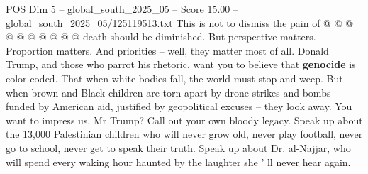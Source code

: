 \begin{textsample}{POS Dim 5 – global\_south\_2025\_05 – Score 15.00 – global\_south\_2025\_05/125119513.txt}
This is not to dismiss the pain of @ @ @ @ @ @ @ @ @ @ death should be diminished.
But perspective matters.
Proportion matters.
And priorities -- well, they matter most of all.
Donald Trump, and those who parrot his rhetoric, want you to believe that \textbf{genocide} is color-coded.
That when white bodies fall, the world must stop and weep.
But when brown and Black children are torn apart by drone strikes and bombs -- funded by American aid, justified by geopolitical excuses -- they look away.
You want to impress us, Mr Trump?
Call out your own bloody legacy.
Speak up about the 13,000 Palestinian children who will never grow old, never play football, never go to school, never get to speak their truth.
Speak up about Dr. al-Najjar, who will spend every waking hour haunted by the laughter she ' ll never hear again.

\end{textsample}
